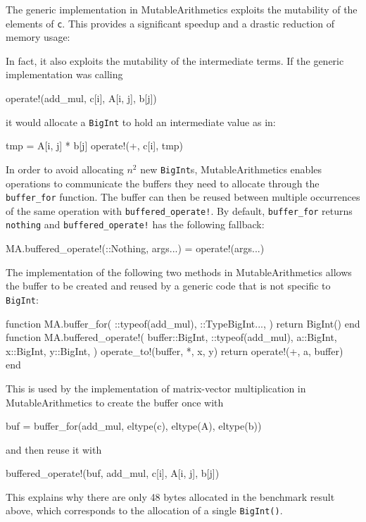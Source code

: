 \documentclass{juliacon}
\newcommand{\ma}{MutableArithmetics}
\begin{document}
The generic implementation in \ma{} exploits the mutability of the elements of \lstinline|c|.
This provides a significant speedup and a drastic reduction of memory usage:

In fact, it also exploits the mutability of the intermediate terms.
If the generic implementation was calling
\begin{jllisting}
operate!(add_mul, c[i], A[i, j], b[j])
\end{jllisting}
it would allocate a \lstinline|BigInt| to hold an intermediate value as in:
\begin{jllisting}
tmp = A[i, j] * b[j]
operate!(+, c[i], tmp)
\end{jllisting}
In order to avoid allocating $n^2$ new \lstinline|BigInt|s,
\ma{} enables operations to communicate the buffers they need to allocate through the \lstinline|buffer_for| function.
The buffer can then be reused between multiple occurrences of the same operation with \lstinline|buffered_operate!|.
By default, \lstinline|buffer_for| returns \lstinline|nothing|
and \lstinline|buffered_operate!| has the following fallback:
\begin{jllisting}
MA.buffered_operate!(::Nothing, args...) = operate!(args...)
\end{jllisting}
The implementation of the following two methods in MutableArithmetics
allows the buffer to be created and reused by a generic code that is not
specific to \lstinline|BigInt|:
\begin{jllisting}
function MA.buffer_for(
    ::typeof(add_mul),
    ::Type{BigInt}...,
)
    return BigInt()
end
function MA.buffered_operate!(
    buffer::BigInt,
    ::typeof(add_mul),
    a::BigInt,
    x::BigInt,
    y::BigInt,
)
    operate_to!(buffer, *, x, y)
    return operate!(+, a, buffer)
end
\end{jllisting}
This is used by the implementation of matrix-vector
multiplication in MutableArithmetics to create the
buffer once with
\begin{jllisting}
buf = buffer_for(add_mul, eltype(c), eltype(A), eltype(b))
\end{jllisting}
and then reuse it with
\begin{jllisting}
buffered_operate!(buf, add_mul, c[i], A[i, j], b[j])
\end{jllisting}
This explains why there are only 48 bytes allocated in the benchmark result above,
which corresponds to the allocation of a single \lstinline|BigInt()|.
\end{document}

